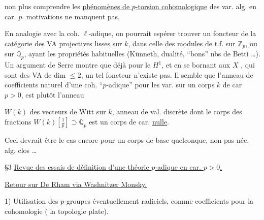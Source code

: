 

non plus comprendre les \uline{phénomènes de $p$-torsion cohomologique} des var. alg. en car. $p$.  motivations  ne manquent pas,  


En analogie avec la coh. $\ell$-adique, on pourrait espérer trouver un foncteur
de la catégorie des VA projectives lisses sur $k$, dans celle des modules de t.f. sur $\mathbb Z_p$, ou sur $\mathbb Q_p$, ayant les propriétés habituelles  (Künneth, dualité, ``bons'' nbs de Betti \ldots). Un argument de Serre montre que déjà pour le $H^1$, et en se bornant aux $X$ , qui sont des VA de dim $\leq 2$, un tel foncteur n'existe pas. Il semble que l'anneau de coefficients naturel d'une coh. ``$p$-adique'' pour les var. sur un corps $k$ de car $p>0$, est plutôt l'anneau



$W(k)$ des vecteurs de Witt sur $k$, anneau de val. discrète dont le corps des fractions $W(k)[\frac1p]\supset\mathbb Q_p$ est un corps de car. \uline{nulle}.

Ceci devrait être le cas encore pour un corps de base  quelconque, non pas néc. alg. clos \ldots

\S 3 \uline{Revue des essais de définition d'une théorie  $p$-adique en car. $p>0$.}

\uline{Retour sur De Rham via Washnitzer Monsky.}


1) Utilisation des $p$-groupes éventuellement radiciels,  comme coefficients pour la cohomologie ( la topologie plate).

